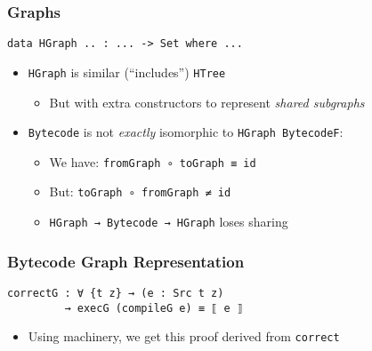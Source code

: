        \begin{frame}[fragile]
            \frametitle{Graphs}

            \begin{verbatim}
data HGraph .. : ... -> Set where ...
            \end{verbatim}
            
            \begin{itemize}
                \item \texttt{HGraph} is similar (``includes'') \texttt{HTree}
                \begin{itemize}
                    \item But with extra constructors to represent \emph{shared subgraphs}
                \end{itemize}
            
                \item \texttt{Bytecode} is not \emph{exactly} isomorphic to \texttt{HGraph BytecodeF}:
                \begin{itemize}
                    \item We have: \texttt{fromGraph ∘ toGraph ≡ id}
                    \item But: \texttt{toGraph ∘ fromGraph ≠ id}
                    \item \texttt{HGraph → Bytecode → HGraph} loses sharing
                \end{itemize}
            \end{itemize}
\end{frame}
         
         \begin{frame}[fragile]
            \frametitle{Bytecode Graph Representation}


            \begin{verbatim}
correctG : ∀ {t z} → (e : Src t z) 
         → execG (compileG e) ≡ ⟦ e ⟧
            \end{verbatim}
            
            \begin{itemize}
                \item Using machinery, we get this proof derived from \texttt{correct}
            \end{itemize}
\end{frame}

